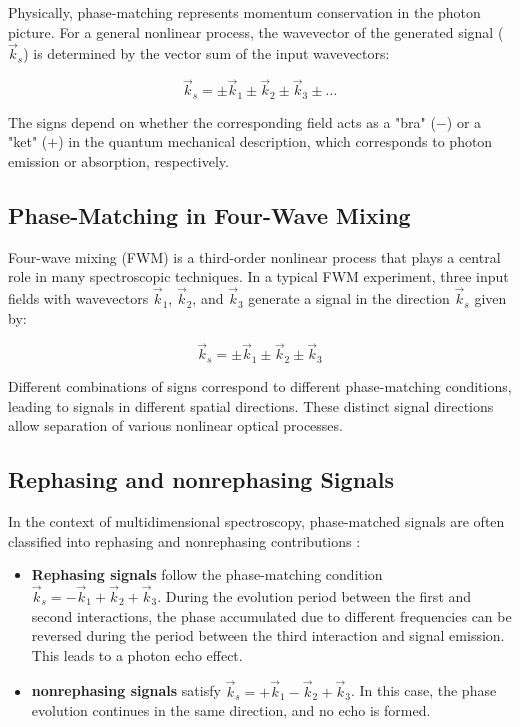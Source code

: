\noindent Physically, phase-matching represents momentum conservation in the photon picture. For a general nonlinear process, the wavevector of the generated signal ($\vec{k}_s$) is determined by the vector sum of the input wavevectors:

\begin{equation}
	\vec{k}_s = \pm\vec{k}_1 \pm\vec{k}_2 \pm\vec{k}_3 \pm \ldots
	\label{eq:phase_matching}
\end{equation}

\noindent The signs depend on whether the corresponding field acts as a "bra" ($-$) or a "ket" ($+$) in the quantum mechanical description, which corresponds to photon emission or absorption, respectively.

\subsection{Phase-Matching in Four-Wave Mixing}
\label{subsec:fwm_phase_matching}

\noindent Four-wave mixing (FWM) is a third-order nonlinear process that plays a central role in many spectroscopic techniques. In a typical FWM experiment, three input fields with wavevectors $\vec{k}_1$, $\vec{k}_2$, and $\vec{k}_3$ generate a signal in the direction $\vec{k}_s$ given by:

\begin{equation}
	\vec{k}_s = \pm\vec{k}_1 \pm\vec{k}_2 \pm\vec{k}_3
	\label{eq:fwm_phase_matching}
\end{equation}

\noindent Different combinations of signs correspond to different phase-matching conditions, leading to signals in different spatial directions. These distinct signal directions allow separation of various nonlinear optical processes.

\subsection{Rephasing and nonrephasing Signals}
\label{subsec:rephasing_nonrephasing}

\noindent In the context of multidimensional spectroscopy, phase-matched signals are often classified into rephasing and nonrephasing contributions \cite{cho2009twodimensionalopticalspectroscopy, jonas2003twodimensionalfemtosecondspectroscopy}:

\begin{itemize}
	\item \textbf{Rephasing signals} follow the phase-matching condition $\vec{k}_s = -\vec{k}_1 + \vec{k}_2 + \vec{k}_3$. During the evolution period between the first and second interactions, the phase accumulated due to different frequencies can be reversed during the period between the third interaction and signal emission. This leads to a photon echo effect.

	\item \textbf{nonrephasing signals} satisfy $\vec{k}_s = +\vec{k}_1 - \vec{k}_2 + \vec{k}_3$. In this case, the phase evolution continues in the same direction, and no echo is formed.
\end{itemize}

